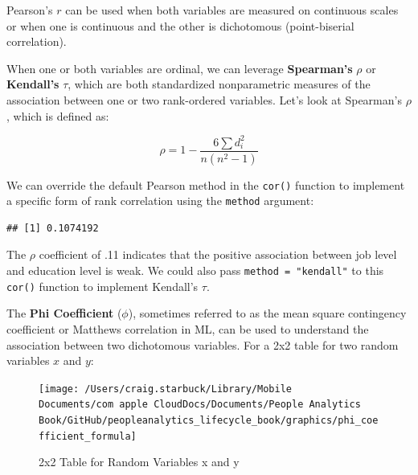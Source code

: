 \documentclass[
]{book}
\newenvironment{Shaded}{\begin{snugshade}}{\end{snugshade}}
\newcommand{\AttributeTok}[1]{\textcolor[rgb]{0.77,0.63,0.00}{#1}}
\newcommand{\CommentTok}[1]{\textcolor[rgb]{0.56,0.35,0.01}{\textit{#1}}}
\newcommand{\FunctionTok}[1]{\textcolor[rgb]{0.00,0.00,0.00}{#1}}
\newcommand{\NormalTok}[1]{#1}
\newcommand{\SpecialCharTok}[1]{\textcolor[rgb]{0.00,0.00,0.00}{#1}}
\newcommand{\StringTok}[1]{\textcolor[rgb]{0.31,0.60,0.02}{#1}}
\begin{document}
Pearson's \(r\) can be used when both variables are measured on continuous scales or when one is continuous and the other is dichotomous (point-biserial correlation).

When one or both variables are ordinal, we can leverage \textbf{Spearman's} \(\rho\) or \textbf{Kendall's} \(\tau\), which are both standardized nonparametric measures of the association between one or two rank-ordered variables. Let's look at Spearman's \(\rho\), which is defined as:

\[ \rho = 1 - {\frac {6 \sum d_i^2}{n(n^2 - 1)}} \]

We can override the default Pearson method in the \texttt{cor()} function to implement a specific form of rank correlation using the \texttt{method} argument:

\begin{Shaded}
\end{Shaded}

\begin{verbatim}
## [1] 0.1074192
\end{verbatim}

The \(\rho\) coefficient of .11 indicates that the positive association between job level and education level is weak. We could also pass \texttt{method\ =\ "kendall"} to this \texttt{cor()} function to implement Kendall's \(\tau\).

The \textbf{Phi Coefficient} (\(\phi\)), sometimes referred to as the mean square contingency coefficient or Matthews correlation in ML, can be used to understand the association between two dichotomous variables. For a 2x2 table for two random variables \(x\) and \(y\):

\begin{figure}

{\centering \texttt{[image: /Users/craig.starbuck/Library/Mobile Documents/com~apple~CloudDocs/Documents/People Analytics Book/GitHub/peopleanalytics\_lifecycle\_book/graphics/phi\_coefficient\_formula]} 

}

\caption{2x2 Table for Random Variables x and y}\label{fig:phi-tbl}
\end{figure}
\end{document}
